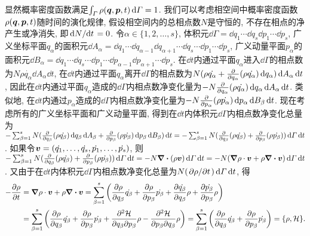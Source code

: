 显然概率密度函数满足$ \int_{\varGamma} \rho(\vb*{q},\vb*{p},t) \dd{\varGamma} =1 $. 我们可以考虑相空间中概率密度函数$ \rho(\vb*{q},\vb*{p},t) $随时间的演化规律, 假设相空间内的总相点数$ N $是守恒的, 不存在相点的净产生或净消失, 即$ \dv*{N}{t}=0 $. 令$ \alpha \in \{1,2,\ldots,s\} $, 体积元$ \dd{\varGamma} = \dd{q_1} \cdots \dd{q_s} \dd{p_1} \cdots \dd{p_s} $, 广义坐标平面$ q_{\alpha} $的面积元$ \dd{A_{\alpha}} = \dd{q_1} \cdots \dd{q_{\alpha-1}} \dd{q_{\alpha+1}} \cdots \dd{q_s} \cdots \dd{p_1} \cdots \dd{p_s} $, 广义动量平面$ p_{\alpha} $的面积元$ \dd{B_{\alpha}} = \dd{q_1} \cdots \dd{q_s} \cdots \dd{p_1} \cdots \dd{p_{\alpha-1}} \dd{p_{\alpha+1}} \cdots \dd{p_s} $. 在$ \dd{t} $内通过平面$ q_{\alpha} $进入$ \dd{\varGamma} $的相点数为$ N \rho \dot{q_{\alpha}} \dd{A_{\alpha}} \dd{t} $, 在$ \dd{t} $内通过平面$ q_{\alpha} $离开$ \dd{\varGamma} $的相点数为$ N (\rho \dot{q_{\alpha}} + \pdv{q_{\alpha}} (\rho \dot{q_{\alpha}}) \dd{q_{\alpha}}) \dd{A_{\alpha}} \dd{t} $, 因此在$ \dd{t} $内通过平面$ q_{\alpha} $造成的$ \dd{\varGamma} $内相点数净变化量为$ - N \pdv{q_{\alpha}} (\rho \dot{q_{\alpha}}) \dd{q_{\alpha}} \dd{A_{\alpha}} \dd{t} $. 类似地, 在$ \dd{t} $内通过$ p_{\alpha} $造成的$ \dd{\varGamma} $内相点数净变化量为$ - N \pdv{p_{\alpha}} (\rho \dot{p_{\alpha}}) \dd{p_{\alpha}} \dd{B_{\beta}} \dd{t} $. 现在考虑所有的广义坐标平面和广义动量平面, 得到在$ \dd{t} $内体积元$ \dd{\varGamma} $内相点数净变化总量为$ - \sum_{\beta=1}^s N (\pdv{q_{\beta}} (\rho \dot{q_{\beta}}) \dd{q_{\beta}} \dd{A_{\beta}} + \pdv{p_{\beta}} (\rho \dot{p_{\beta}}) \dd{p_{\beta}} \dd{B_{\beta}}) \dd{t} = -\sum_{\beta=1}^s N (\pdv{q_{\beta}} (\rho \dot{q_{\beta}}) + \pdv{p_{\beta}} (\rho \dot{p_{\beta}}) ) \dd{\varGamma}\dd{t} $. 如果令$ \vb*{v}=(\dot{q_1},\ldots,\dot{q_s},\dot{p_1},\ldots,\dot{p_s}) $, 则$ -\sum_{\beta=1}^s N (\pdv{q_{\beta}} (\rho \dot{q_{\beta}}) + \pdv{p_{\beta}} (\rho \dot{p_{\beta}}) ) \dd{\varGamma}\dd{t} = -N \div{(\rho \vb*{v})} \dd{\varGamma}\dd{t} = -N (\grad{\rho} \cdot \vb*{v} + \rho \div{\vb*{v}}) \dd{\varGamma}\dd{t} $. 又由于在$ \dd{t} $内体积元$ \dd{\varGamma} $内相点数净变化总量为$ N (\pdv*{\rho}{t}) \dd{\varGamma}\dd{t} $, 得
\begin{align*}
    -\pdv{\rho}{t} &= \grad{\rho} \cdot \vb*{v} + \rho \div{\vb*{v}} = \sum_{\beta=1}^s \bigg(\pdv{\rho}{q_{\beta}} \dot{q_{\beta}} + \pdv{\rho}{p_{\beta}} \dot{p_{\beta}} + \pdv{\dot{q_{\beta}}}{q_{\beta}} \rho + \pdv{\dot{p_{\beta}}}{p_{\beta}} \rho \bigg)\\
    &= \sum_{\beta=1}^s \bigg(\pdv{\rho}{q_{\beta}} \dot{q_{\beta}} + \pdv{\rho}{p_{\beta}} \dot{p_{\beta}} + \pdv{\hami}{q_{\beta}}{p_{\beta}} \rho - \pdv{\hami}{p_{\beta}}{q_{\beta}} \rho \bigg) = \sum_{\beta=1}^s \bigg(\pdv{\rho}{q_{\beta}} \dot{q_{\beta}} + \pdv{\rho}{p_{\beta}} \dot{p_{\beta}} \bigg) = \pb{\rho}{\hami}.
\end{align*}
